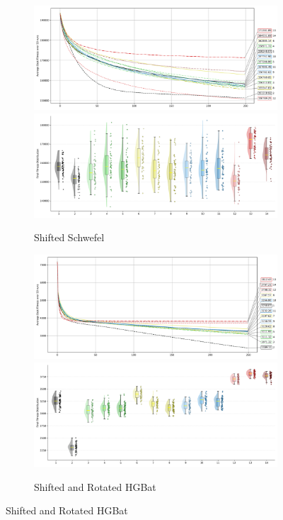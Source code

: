 \begin{figure}[p]\ContinuedFloat
\renewcommand\thesubfigure{C.\arabic{figure}.\arabic{subfigure}} %

    \centering
\begin{subfigure}{1\textwidth}
    \centering
    \includegraphics[width=.49\textwidth]{Figures/results/500/Shifted_Schwefel_All_selected_algorithms_dim500_annot_legend.png}
    \includegraphics[width=.49\textwidth]{Figures/results/500/Shifted_Schwefel_all_dim500_raincloud_vertical.png}
    \caption{Shifted Schwefel}
\end{subfigure}

\begin{subfigure}{1\textwidth}
    \centering
    \includegraphics[width=.49\textwidth]{Figures/results/500/Shifted_and_Rotated_HGBat_All_selected_algorithms_dim500_annot_legend.png}
    \includegraphics[width=.49\textwidth]{Figures/results/500/Shifted_and_Rotated_HGBat_all_dim500_raincloud_vertical.png}
    \caption{Shifted and Rotated HGBat}
\end{subfigure}


\end{figure}
